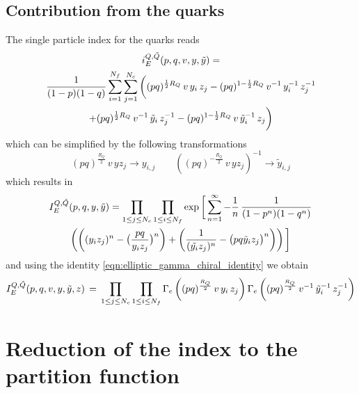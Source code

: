 \begin{appendices}
\subsection{Contribution from the quarks}

The single particle index for the quarks reads
\begin{multline}
i_E^{Q,\tilde{Q}} (p,q,v,y,\tilde{y})=\\ 
{1\over (1-p)(1-q)} \sum_{i=1}^{N_f} \sum_{j=1}^{N_c}
\bigg(
(p q)^{{1\over 2}R_Q} \, v \, y_i \, z_j
- (p q)^{1- {1\over 2} R_Q} \, v^{-1} \, y_i^{-1} \, z_j^{-1} \\
 + 
(p q)^{{1\over 2}R_Q}\, v^{-1}\, {\tilde y}_i \,z_j^{-1}
- (p q)^{1- {1\over 2}R_Q} \, v\, {\tilde y_i}^{-1}\, z_j\bigg) 
\end{multline}
which can be simplified by the following transformations
\begin{equation}
(pq)^{\frac{R_Q}{2}} \, v \, y z_j \rightarrow  y_{i,j} \qquad 
\left( (pq)^{- \frac{R_Q}{2}} \, v \, y z_j \right)^{-1}\rightarrow  \tilde{y}_{i,j}
\end{equation}
which results in
\begin{multline}
I_E^{Q,\tilde{Q}}(p,q,y,\tilde{y})  =
\prod_{ 1 \leq j \leq N_c} \prod_{ 1 \leq i \leq N_f} \exp \bigg[ \sum_{n=1}^{\infty} - {1 \over n} \, {1 \over (1-p^n)( 1-q^n)}
\\
\left( \bigg( (y_i z_j)^n - \big({ pq \over y_i z_j}\big)^n \bigg) + \left(  {1 \over  (\tilde{y_i} z_j)^n } - \big( { pq \tilde y_i z_j} \big)^n \right)  \right) \bigg]
\end{multline}
and using the identity \eqref{eqn:elliptic_gamma_chiral_identity} we obtain
\begin{equation}
I_E^{Q,\tilde{Q}} ( p ,q,v,y,\tilde{y},z) \, = \, \prod_{ 1 \leq j \leq N_c} \prod_{ 1 \leq i \leq N_f} \Gamma_e \left( (pq)^{R_Q \over 2} \, v  \,  y_i \,  z_j \right)
\Gamma_e \left( (pq)^{R_Q \over 2}\,  v^{-1} \,  {\tilde y_i}^{-1}\,  z_j^{-1}\right)
\end{equation}














\section{Reduction of the index to the partition function}
\label{appendix:reduction_index_to_pf}
\begin{comment}

\end{comment}
\end{appendices}
